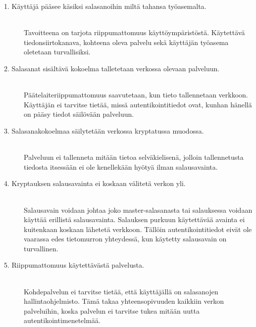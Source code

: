 \documentclass[english,gradu]{tktltiki}
\begin{document}
         \begin{description}

           \item[1. Käyttäjä pääsee käsiksi salasanoihin miltä tahansa työasemalta.] \hfill \\
               Tavoitteena on tarjota riippumattomuus käyttöympäristöstä.
               Käytettävä tiedonsiirtokanava, kohteena oleva palvelu sekä käyttäjän työasema oletetaan turvallisiksi.

           \item[2. Salasanat sisältävä kokoelma talletetaan verkossa olevaan palveluun.] \hfill \\
               Päätelaiteriippumattomuus saavutetaan, kun tieto tallennetaan verkkoon.
               Käyttäjän ei tarvitse tietää, missä autentikointitiedot ovat, kunhan hänellä on pääsy
               tiedot säilövään palveluun.

           \item[3. Salasanakokoelmaa säilytetään verkossa kryptatussa muodossa.] \hfill \\
               Palveluun ei tallenneta mitään tietoa selväkielisenä, jolloin tallennetusta tiedosta itsessään
               ei ole kenellekään hyötyä ilman salausavainta.

           \item[4. Kryptauksen salausavainta ei koskaan välitetä verkon yli.] \hfill \\
               Salausavain voidaan johtaa joko master-salasanasta tai salauksessa voidaan käyttää erillistä
               salausavainta. Salauksen purkuun käytettävää avainta ei kuitenkaan koskaan lähetetä verkkoon. Tällöin
               autentikointitiedot eivät ole vaarassa edes tietomurron yhteydessä, kun käytetty salausavain on
               turvallinen.

           \item[5. Riippumattomuus käytettävästä palvelusta.] \hfill \\
               Kohdepalvelun ei tarvitse tietää, että käyttäjällä on salasanojen hallintaohjelmisto.
               Tämä takaa yhteensopivuuden kaikkiin verkon palveluihin, koska palvelun ei tarvitse tukea mitään uutta
               autentikointimenetelmää.

         \end{description}


\end{document}
